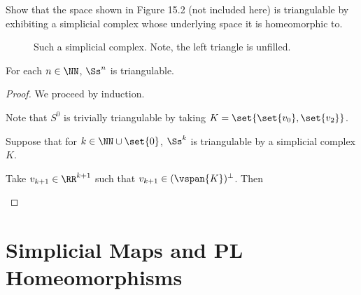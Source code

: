 \begin{problem}[15.15]
  Show that the space shown in Figure 15.2 (not included here) is triangulable
  by exhibiting a simplicial complex whose underlying space it is homeomorphic
  to.
\end{problem}
\begin{solution}
  \begin{figure}[H]
    \centering
    \caption{Such a simplicial complex. Note, the left triangle is unfilled.}
  \end{figure}
\end{solution}
\begin{problem}[15.6]
  For each $n \in \NN$, $\Ss^n$ is triangulable.
\end{problem}
\begin{proof}
  We proceed by induction.

  \begin{induction}
    \item Note that $S^0$ is trivially triangulable by taking $K =
      \set{\set{v_0}, \set{v_2}}$.
    \item Suppose that for $k \in \NN \cup \set{0}$, $\Ss^k$ is triangulable by
      a simplicial complex $K$.
    \item Take $v_{k+1} \in \RR^{k+1}$ such that $v_{k+1} \in
      (\vspan{K})^\perp$. Then
  \end{induction}
\end{proof}
\section{Simplicial Maps and PL Homeomorphisms}
